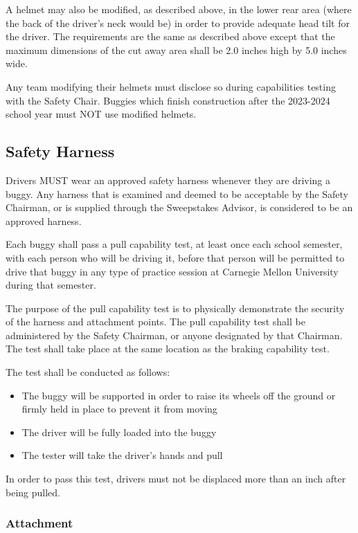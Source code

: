 	A helmet may also be modified, as described above, in the lower rear area (where the back of the driver's neck would be) in order to provide adequate head tilt for the driver. The requirements are the same as described above except that the maximum dimensions of the cut away area shall be 2.0 inches high by 5.0 inches wide.

	Any team modifying their helmets must disclose so during capabilities testing with the Safety Chair. Buggies which finish construction after the 2023-2024 school year must NOT use modified helmets.

\subsection{Safety Harness}

	Drivers MUST wear an approved safety harness whenever they are driving a buggy. Any harness that is examined and deemed to be acceptable by the Safety Chairman, or is supplied through the Sweepstakes Advisor, is considered to be an approved harness. 

	Each buggy shall pass a pull capability test, at least once each school semester, with each person who will be driving it, before that person will be permitted to drive that buggy in any type of practice session at Carnegie Mellon University during that semester. 

	The purpose of the pull capability test is to physically demonstrate the security of the harness and attachment points. The pull capability test shall be administered by the Safety Chairman, or anyone designated by that Chairman. The test shall take place at the same location as the braking capability test. 

	The test shall be conducted as follows: 
	\begin{itemize}
		\item
		The buggy will be supported in order to raise its wheels off the ground or firmly held in place to prevent it from moving

		\item
		The driver will be fully loaded into the buggy
	
		\item
		The tester will take the driver's hands and pull		
	\end{itemize}

	In order to pass this test, drivers must not be displaced more than an inch after being pulled. 


\subsubsection{Attachment}

